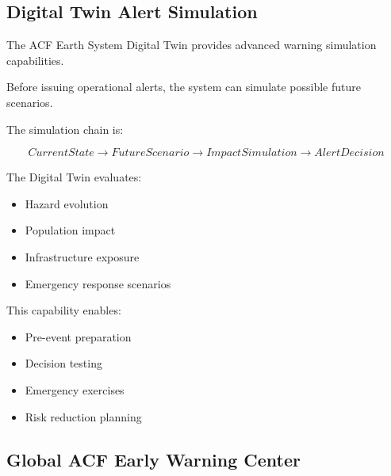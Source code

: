 \subsection{Digital Twin Alert Simulation}

The ACF Earth System Digital Twin provides advanced warning simulation
capabilities.

Before issuing operational alerts, the system can simulate possible
future scenarios.

The simulation chain is:

\[
CurrentState
\rightarrow
FutureScenario
\rightarrow
ImpactSimulation
\rightarrow
AlertDecision
\]


The Digital Twin evaluates:

\begin{itemize}

\item Hazard evolution

\item Population impact

\item Infrastructure exposure

\item Emergency response scenarios

\end{itemize}


This capability enables:

\begin{itemize}

\item Pre-event preparation

\item Decision testing

\item Emergency exercises

\item Risk reduction planning

\end{itemize}



\subsection{Global ACF Early Warning Center}


